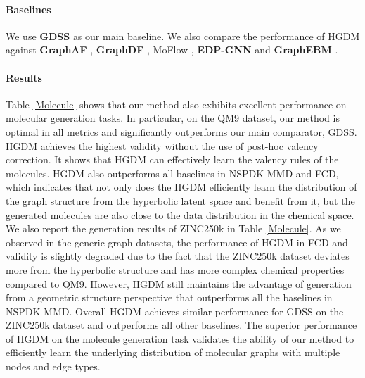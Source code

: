 \documentclass[letterpaper]{article} %
\begin{document}
\paragraph{Baselines}
We use \textbf{GDSS} \cite{jo2022score} as our main baseline. We also compare the performance of HGDM against \textbf{GraphAF} \cite{shi2020graphaf}, \textbf{GraphDF} \cite{luo2021graphdf}, MoF\textbf{}low \cite{zang2020moflow}, \textbf{EDP-GNN} \cite{niu2020permutation} and \textbf{GraphEBM} \cite{liu2021graphebm}.
\begin{table}
\Huge
  \centering
  \caption{Generation results of the variants of GDSS and HGDM on the QM9 dataset.}
  \label{Ablation}
\end{table}

\paragraph{Results}
Table \ref{Molecule} shows that our method also exhibits excellent performance on molecular generation tasks. In particular, on the QM9 dataset, our method is optimal in all metrics and significantly outperforms our main comparator, GDSS. HGDM achieves the highest validity without the use of post-hoc valency correction. It shows that HGDM can effectively learn the valency rules of the molecules. HGDM also outperforms all baselines in NSPDK MMD and FCD, which indicates that not only does the HGDM efficiently learn the distribution of the graph structure from the hyperbolic latent space and benefit from it, but the generated molecules are also close to the data distribution in the chemical space.
We also report the generation results of ZINC250k in Table \ref{Molecule}. As we observed in the generic graph datasets, the performance of HGDM in FCD and validity is slightly degraded due to the fact that the ZINC250k dataset deviates more from the hyperbolic structure and has more complex chemical properties compared to QM9. However, HGDM still maintains the advantage of generation from a geometric structure perspective that outperforms all the baselines in NSPDK MMD. Overall HGDM achieves similar performance for GDSS on the ZINC250k dataset and outperforms all other baselines. The superior performance of HGDM on the molecule generation task validates the ability of our method to efficiently learn the underlying distribution of molecular graphs with multiple nodes and edge types.
\end{document}
